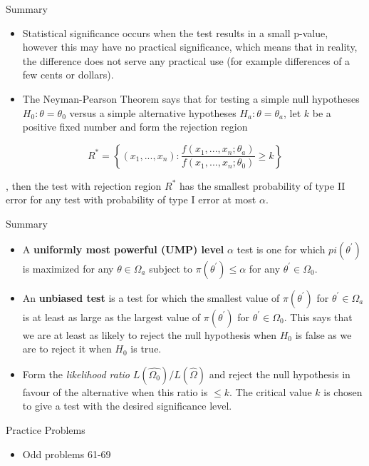 \documentclass[
  ignorenonframetext,
]{beamer}
\providecommand{\tightlist}{%
  \setlength{\itemsep}{0pt}\setlength{\parskip}{0pt}}\usepackage{longtable,booktabs,array}
\begin{document}
\begin{frame}{Summary}
\protect\hypertarget{summary-7}{}
\begin{itemize}[<+->]
\tightlist
\item
  Statistical significance occurs when the test results in a small
  p-value, however this may have no practical significance, which means
  that in reality, the difference does not serve any practical use (for
  example differences of a few cents or dollars).
\item
  The Neyman-Pearson Theorem says that for testing a simple null
  hypotheses \(H_{0}: \theta = \theta_{0}\) versus a simple alternative
  hypotheses \(H_{a}: \theta = \theta_{a}\), let \(k\) be a positive
  fixed number and form the rejection region
\end{itemize}

\[ 
R^{*} = \left\{(x_{1},...,x_{n}): \frac{f(x_{1},...,x_{n};\theta_{a})}{f(x_{1},...,x_{n};\theta_{0})} \geq k \right\}
\]

, then the test with rejection region \(R^{*}\) has the smallest
probability of type II error for any test with probability of type I
error at most \(\alpha\).
\end{frame}

\begin{frame}{Summary}
\protect\hypertarget{summary-8}{}
\begin{itemize}[<+->]
\tightlist
\item
  A \textbf{uniformly most powerful (UMP) level} \(\alpha\) test is one
  for which \(pi(\theta^{\prime})\) is maximized for any
  \(\theta \in \Omega_{a}\) subject to
  \(\pi(\theta^{\prime}) \leq \alpha\) for any
  \(\theta^{\prime} \in \Omega_{0}\).
\item
  An \textbf{unbiased test} is a test for which the smallest value of
  \(\pi(\theta^{\prime})\) for \(\theta^{\prime} \in \Omega_{a}\) is at
  least as large as the largest value of \(\pi(\theta^{\prime})\) for
  \(\theta^{\prime} \in \Omega_{0}\). This says that we are at least as
  likely to reject the null hypothesis when \(H_{0}\) is false as we are
  to reject it when \(H_{0}\) is true.
\item
  Form the \emph{likelihood ratio} \(L(\hat{\Omega_{0}})/L(\hat\Omega)\)
  and reject the null hypothesis in favour of the alternative when this
  ratio is \(\leq k\). The critical value \(k\) is chosen to give a test
  with the desired significance level.
\end{itemize}
\end{frame}

\begin{frame}{Practice Problems}
\protect\hypertarget{practice-problems-4}{}
\begin{itemize}[<+->]
\tightlist
\item
  Odd problems 61-69
\end{itemize}
\end{frame}
\end{document}
